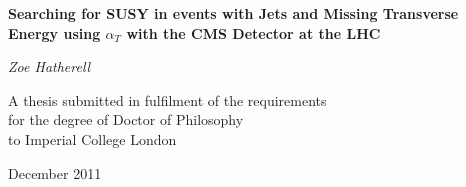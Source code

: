 \pagestyle{empty}

\begin{center}
\LARGE
{\bf  Searching for SUSY in events with Jets and Missing Transverse Energy using $\alpha_{T}$ with the CMS Detector at the LHC}

\vspace{1cm}

\large
{\it Zoe Hatherell}

\vspace{2cm}
\normalsize
A thesis submitted in fulfilment of the requirements\\
for the degree of Doctor of Philosophy\\
to Imperial College London

December 2011
\end{center}

